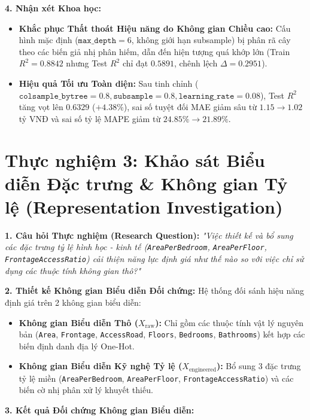 \documentclass[12pt,a4paper]{report}
\begin{document}
\textbf{4. Nhận xét Khoa học:}
\begin{itemize}[leftmargin=1.5em]
    \item \textbf{Khắc phục Thất thoát Hiệu năng do Không gian Chiều cao:} Cấu hình mặc định ($\texttt{max\_depth}=6$, không giới hạn subsample) bị phân rã cây theo các biến giả nhị phân hiếm, dẫn đến hiện tượng quá khớp lớn (Train $R^2 = 0.8842$ nhưng Test $R^2$ chỉ đạt $0.5891$, chênh lệch $\Delta = 0.2951$).
    \item \textbf{Hiệu quả Tối ưu Toàn diện:} Sau tinh chỉnh ($\texttt{colsample\_bytree}=0.8, \texttt{subsample}=0.8, \texttt{learning\_rate}=0.08$), Test $R^2$ tăng vọt lên $\mathbf{0.6329}$ ($+4.38\%$), sai số tuyệt đối MAE giảm sâu từ $1.15 \to \mathbf{1.02}$ tỷ VNĐ và sai số tỷ lệ MAPE giảm từ $24.85\% \to \mathbf{21.89\%}$.
\end{itemize}

\section{Thực nghiệm 3: Khảo sát Biểu diễn Đặc trưng \& Không gian Tỷ lệ (Representation Investigation)}

\textbf{1. Câu hỏi Thực nghiệm (Research Question):}
\textit{"Việc thiết kế và bổ sung các đặc trưng tỷ lệ hình học - kinh tế (\texttt{AreaPerBedroom}, \texttt{AreaPerFloor}, \texttt{FrontageAccessRatio}) cải thiện năng lực định giá như thế nào so với việc chỉ sử dụng các thuộc tính không gian thô?"}

\textbf{2. Thiết kế Không gian Biểu diễn Đối chứng:}
Hệ thống đối sánh hiệu năng định giá trên 2 không gian biểu diễn:
\begin{itemize}[leftmargin=1.5em]
    \item \textbf{Không gian Biểu diễn Thô ($X_{\text{raw}}$):} Chỉ gồm các thuộc tính vật lý nguyên bản (\texttt{Area}, \texttt{Frontage}, \texttt{AccessRoad}, \texttt{Floors}, \texttt{Bedrooms}, \texttt{Bathrooms}) kết hợp các biến định danh địa lý One-Hot.
    \item \textbf{Không gian Biểu diễn Kỹ nghệ Tỷ lệ ($X_{\text{engineered}}$):} Bổ sung 3 đặc trưng tỷ lệ miền (\texttt{AreaPerBedroom}, \texttt{AreaPerFloor}, \texttt{FrontageAccessRatio}) và các biến cờ nhị phân xử lý khuyết thiếu.
\end{itemize}

\textbf{3. Kết quả Đối chứng Không gian Biểu diễn:}
\end{document}
